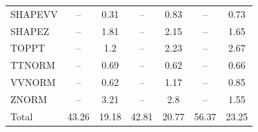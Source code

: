 \begin{table}[H]
\begin{center}
\begin{footnotesize}
\begin{tabular}{lcccccc}
				SHAPEVV & -- &  0.31 & -- &  0.83 & -- &  0.73 \\
				SHAPEZ & -- &  1.81 & -- &  2.15 & -- &  1.65 \\
				TOPPT & -- &  1.2 & -- &  2.23 & -- &  2.67 \\
				TTNORM & -- &  0.69 & -- &  0.62 & -- &  0.66 \\
				VVNORM & -- &  0.62 & -- &  1.17 & -- &  0.85 \\
				ZNORM & -- &  3.21 & -- &  2.8 & -- &  1.55 \\
				Total &  43.26  &  19.18 &  42.81  &  20.77 &  56.37  &  23.25 \\ \hline \hline
			\end{tabular}
			\label{tab:SysUncertainties_1900}
        \end{footnotesize}
	\end{center}
\end{table}


